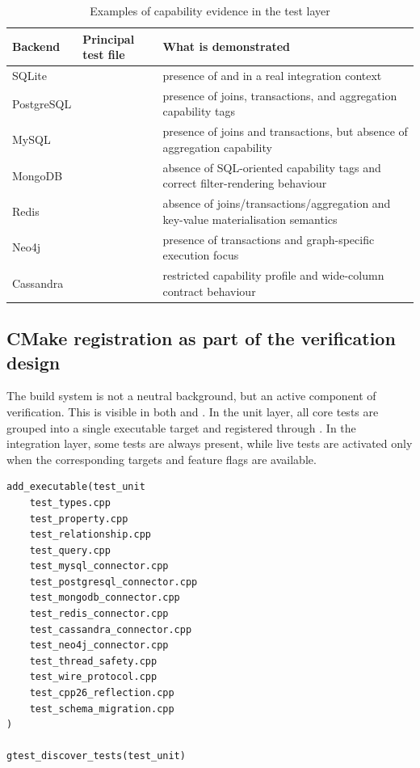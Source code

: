 \begin{table}[H]
\centering
\small
\caption{Examples of capability evidence in the test layer}
\label{tab:appendix_capability_evidence}
\begin{tabularx}{\textwidth}{L{2.6cm}L{2.6cm}Z}
\toprule
\textbf{Backend} & \textbf{Principal test file} & \textbf{What is demonstrated} \\
\midrule
SQLite &  & presence of  and  in a real integration context \\
PostgreSQL &  & presence of joins, transactions, and aggregation capability tags \\
MySQL &  & presence of joins and transactions, but absence of aggregation capability \\
MongoDB &  & absence of SQL-oriented capability tags and correct filter-rendering behaviour \\
Redis &  & absence of joins/transactions/aggregation and key-value materialisation semantics \\
Neo4j &  & presence of transactions and graph-specific execution focus \\
Cassandra &  & restricted capability profile and wide-column contract behaviour \\
\bottomrule
\end{tabularx}
\end{table}

\subsection{CMake registration as part of the verification design}

The build system is not a neutral background, but an active component of verification. This is visible in both  and . In the unit layer, all core tests are grouped into a single executable target and registered through . In the integration layer, some tests are always present, while live tests are activated only when the corresponding targets and feature flags are available.

\begin{lstlisting}[caption={Excerpt from unit-test registration},label={lst:appendix_unit_cmake}]
add_executable(test_unit
    test_types.cpp
    test_property.cpp
    test_relationship.cpp
    test_query.cpp
    test_mysql_connector.cpp
    test_postgresql_connector.cpp
    test_mongodb_connector.cpp
    test_redis_connector.cpp
    test_cassandra_connector.cpp
    test_neo4j_connector.cpp
    test_thread_safety.cpp
    test_wire_protocol.cpp
    test_cpp26_reflection.cpp
    test_schema_migration.cpp
)

gtest_discover_tests(test_unit)
\end{lstlisting}

